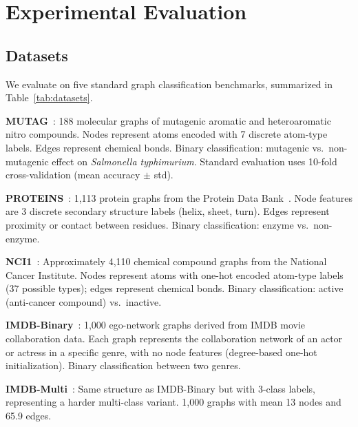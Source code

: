 \documentclass[journal]{IEEEtran}
\begin{document}
\section{Experimental Evaluation}
\label{sec:eval}

\subsection{Datasets}

We evaluate on five standard graph classification benchmarks, summarized
in Table~\ref{tab:datasets}.

\textbf{MUTAG}~\cite{MUTAG1991}: 188 molecular graphs of mutagenic aromatic
and heteroaromatic nitro compounds. Nodes represent atoms encoded with
7 discrete atom-type labels. Edges represent chemical bonds. Binary
classification: mutagenic vs.\ non-mutagenic effect on \emph{Salmonella
typhimurium}. Standard evaluation uses 10-fold cross-validation (mean
accuracy $\pm$ std).

\textbf{PROTEINS}~\cite{PROTEINS2003}: 1,113 protein graphs from the
Protein Data Bank~\cite{Berman2000PDB}. Node features are 3 discrete
secondary structure labels (helix, sheet, turn). Edges represent proximity
or contact between residues. Binary classification: enzyme vs.\ non-enzyme.

\textbf{NCI1}~\cite{NCI1}: Approximately 4,110 chemical compound graphs
from the National Cancer Institute. Nodes represent atoms with one-hot
encoded atom-type labels (37 possible types); edges represent chemical
bonds. Binary classification: active (anti-cancer compound) vs.\
inactive.

\textbf{IMDB-Binary}~\cite{IMDB2015}: 1,000 ego-network graphs derived
from IMDB movie collaboration data. Each graph represents the
collaboration network of an actor or actress in a specific genre, with
no node features (degree-based one-hot initialization). Binary
classification between two genres.

\textbf{IMDB-Multi}~\cite{IMDB2015}: Same structure as IMDB-Binary but
with 3-class labels, representing a harder multi-class variant. 1,000
graphs with mean 13 nodes and 65.9 edges.
\end{document}
